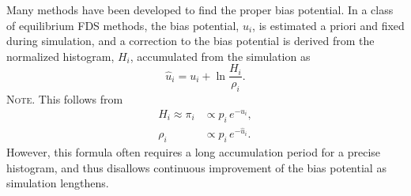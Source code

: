 \documentclass[reprint, superscriptaddress, floatfix]{revtex4-1}
\newcommand{\note}[1]{{\color{DarkGreen}\footnotesize \textsc{Note.} #1}}
\begin{document}
Many methods\cite{mezei1987, berg1992, *lee1993,
wang2001, *wang2001pre, huber1994,
*laio2002, *laio2008, *barducci2011, *sutto2012}
have been developed to find the proper bias potential.
%
In a class of equilibrium FDS methods\cite{
  mezei1987, berg1992, *lee1993, marinari1992, *lyubartsev1992},
the bias potential, $u_i$, is
estimated a priori and fixed
during simulation,
%
and a correction to the bias potential
is derived from the normalized histogram, $H_i$,
accumulated from the simulation as
%
%
\begin{equation}
  \hat u_i
  =
  u_i
  +
  \ln \frac{ H_i }
           { \rho_i }.
  \label{eq:vcorr_equil}
\end{equation}
%
\note{This follows from
  \begin{align*}
    H_i \approx \pi_i
    &\propto p_i \, e^{-u_i},
    \\
    \rho_i
    &\propto p_i \, e^{-\hat u_i}.
  \end{align*}
}
However, this formula often requires a long
accumulation period for a precise histogram,
and thus disallows
continuous improvement of the bias potential
as simulation lengthens.
\end{document}
